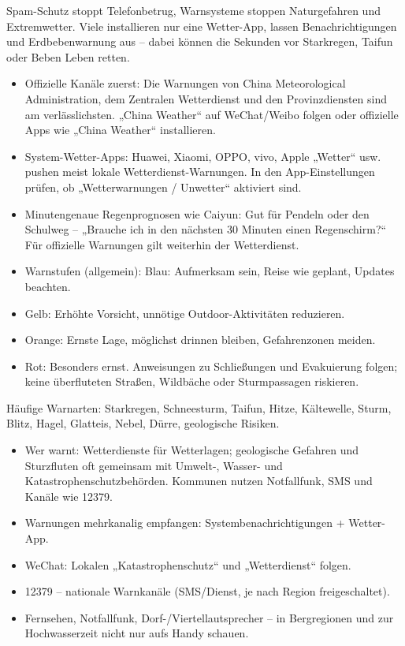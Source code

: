 
Spam-Schutz stoppt Telefonbetrug, Warnsysteme stoppen Naturgefahren und Extremwetter. Viele installieren nur eine Wetter-App, lassen Benachrichtigungen und Erdbebenwarnung aus – dabei können die Sekunden vor Starkregen, Taifun oder Beben Leben retten.


\begin{itemize}
  \item Offizielle Kanäle zuerst: Die Warnungen von China Meteorological Administration, dem Zentralen Wetterdienst und den Provinzdiensten sind am verlässlichsten. „China Weather“ auf WeChat/Weibo folgen oder offizielle Apps wie „China Weather“ installieren.
  \item System-Wetter-Apps: Huawei, Xiaomi, OPPO, vivo, Apple „Wetter“ usw. pushen meist lokale Wetterdienst-Warnungen. In den App-Einstellungen prüfen, ob „Wetterwarnungen / Unwetter“ aktiviert sind.
  \item Minutengenaue Regenprognosen wie Caiyun: Gut für Pendeln oder den Schulweg – „Brauche ich in den nächsten 30 Minuten einen Regenschirm?“ Für offizielle Warnungen gilt weiterhin der Wetterdienst.
  \item Warnstufen (allgemein): Blau: Aufmerksam sein, Reise wie geplant, Updates beachten.
  \item Gelb: Erhöhte Vorsicht, unnötige Outdoor-Aktivitäten reduzieren.
  \item Orange: Ernste Lage, möglichst drinnen bleiben, Gefahrenzonen meiden.
  \item Rot: Besonders ernst. Anweisungen zu Schließungen und Evakuierung folgen; keine überfluteten Straßen, Wildbäche oder Sturmpassagen riskieren.
\end{itemize}

Häufige Warnarten: Starkregen, Schneesturm, Taifun, Hitze, Kältewelle, Sturm, Blitz, Hagel, Glatteis, Nebel, Dürre, geologische Risiken.


\begin{itemize}
  \item Wer warnt: Wetterdienste für Wetterlagen; geologische Gefahren und Sturzfluten oft gemeinsam mit Umwelt-, Wasser- und Katastrophenschutzbehörden. Kommunen nutzen Notfallfunk, SMS und Kanäle wie 12379.
  \item Warnungen mehrkanalig empfangen: Systembenachrichtigungen + Wetter-App.
  \item WeChat: Lokalen „Katastrophenschutz“ und „Wetterdienst“ folgen.
  \item 12379 – nationale Warnkanäle (SMS/Dienst, je nach Region freigeschaltet).
  \item Fernsehen, Notfallfunk, Dorf-/Viertellautsprecher – in Bergregionen und zur Hochwasserzeit nicht nur aufs Handy schauen.
\end{itemize}

